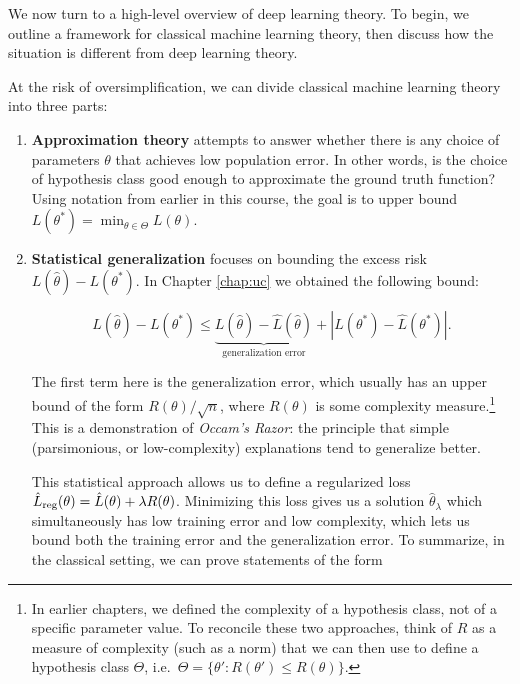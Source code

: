 \setcounter{section}{0}


We now turn to a high-level overview of deep learning theory. To begin, we outline a framework for classical machine learning theory, then discuss how the situation is different from deep learning theory.

At the risk of oversimplification, we can divide classical machine learning theory into three parts:

\begin{enumerate}
\item {\bf Approximation theory} attempts to answer whether there is any choice of parameters $\theta$ that achieves low population error. In other words, is the choice of hypothesis class good enough to approximate the ground truth function? Using notation from earlier in this course, the goal is to upper bound $L(\theta^*) = \min_{\theta \in \Theta} L(\theta).$
    
\item {\bf Statistical generalization} focuses on bounding the excess risk $L(\hat{\theta}) - L(\theta^*)$. In Chapter \ref{chap:uc} we obtained the following bound:
    
\begin{equation}
L(\hat{\theta})-L(\theta^*)\leq \underbrace{L(\hat{\theta})-\hat{L}(\hat{\theta})}_{\text{generalization error}} + |L(\theta^*)-\hat{L}(\theta^*)|.
\end{equation}
    
The first term here is the generalization error, which usually has an upper bound of the form $R(\theta)/\sqrt{n}$, where $R(\theta)$ is some complexity measure.\footnote{In earlier chapters, we defined the complexity of a hypothesis class, not of a specific parameter value. To reconcile these two approaches, think of $R$ as a measure of complexity (such as a norm) that we can then use to define a hypothesis class $\Theta$, i.e.~$\Theta = \{\theta' : R(\theta') \le R(\theta)\}$.} This is a demonstration of \textit{Occam's Razor}: the principle that simple (parsimonious, or low-complexity) explanations tend to generalize better. 
    
This statistical approach allows us to define a regularized loss  $\hat{L}_{\textup{reg}}(\theta)=\hat{L}(\theta)+\lambda R(\theta)$. Minimizing this loss gives us a solution $\hat{\theta}_\lambda$ which simultaneously has low training error and low complexity, which lets us bound both the training error and the generalization error. To summarize, in the classical setting, we can prove statements of the form
    

\end{enumerate}

